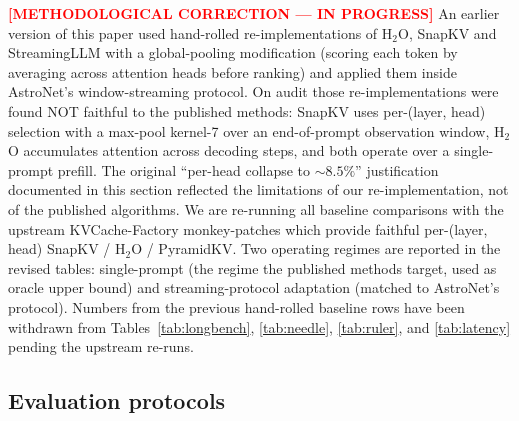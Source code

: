 \textcolor{red}{\textbf{[METHODOLOGICAL CORRECTION — IN PROGRESS]}} An
earlier version of this paper used hand-rolled re-implementations of
H${}_2$O, SnapKV and StreamingLLM with a global-pooling
modification (scoring each token by averaging across attention heads
before ranking) and applied them inside AstroNet's window-streaming
protocol. On audit those re-implementations were found NOT faithful
to the published methods: SnapKV uses per-(layer, head) selection
with a max-pool kernel-7 over an end-of-prompt observation window,
H${}_2$O accumulates attention across decoding steps, and both
operate over a single-prompt prefill. The original ``per-head
collapse to $\sim 8.5\%$'' justification documented in this section
reflected the limitations of our re-implementation, not of the
published algorithms. We are re-running all baseline comparisons
with the upstream KVCache-Factory monkey-patches
\cite{cai2024pyramidkv} which provide faithful per-(layer, head)
SnapKV / H${}_2$O / PyramidKV. Two operating regimes are reported in
the revised tables: single-prompt (the regime the published methods
target, used as oracle upper bound) and streaming-protocol adaptation
(matched to AstroNet's protocol). Numbers from the previous
hand-rolled baseline rows have been withdrawn from
Tables~\ref{tab:longbench}, \ref{tab:needle}, \ref{tab:ruler}, and
\ref{tab:latency} pending the upstream re-runs.


\subsection{Evaluation protocols}\label{sec:eval}

